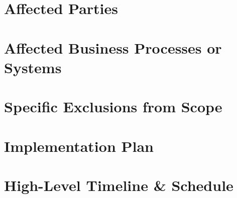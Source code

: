 \documentclass[a4paper]{article}
\begin{document}
\section{Affected Parties} %

\section{Affected Business Processes or Systems} %

\section{Specific Exclusions from Scope} %

\section{Implementation Plan} %

\section{High-Level Timeline \& Schedule} %
\end{document}
